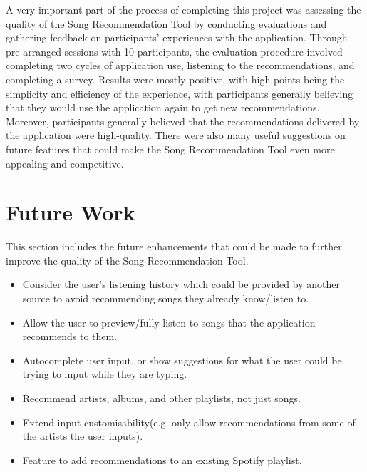 \documentclass{l4proj}
\begin{document}
A very important part of the process of completing this project was assessing the quality of the Song Recommendation Tool by conducting evaluations and gathering feedback on participants' experiences with the application. Through pre-arranged sessions with 10 participants, the evaluation procedure involved completing two cycles of application use, listening to the recommendations, and completing a survey. Results were mostly positive, with high points being the simplicity and efficiency of the experience, with participants generally believing that they would use the application again to get new recommendations. Moreover, participants generally believed that the recommendations delivered by the application were high-quality. There were also many useful suggestions on future features that could make the Song Recommendation Tool even more appealing and competitive.\\[8pt]

\section{Future Work}
This section includes the future enhancements that could be made to further improve the quality of the Song Recommendation Tool.
\begin{itemize}
    \item Consider the user's listening history which could be provided by another source to avoid recommending songs they already know/listen to.
    \item Allow the user to preview/fully listen to songs that the application recommends to them.
    \item Autocomplete user input, or show suggestions for what the user could be trying to input while they are typing.
    \item Recommend artists, albums, and other playlists, not just songs.
    \item Extend input customisability(e.g. only allow recommendations from some of the artists the user inputs).
    \item Feature to add recommendations to an existing Spotify playlist.
\end{itemize}
%
% 
\end{document}
